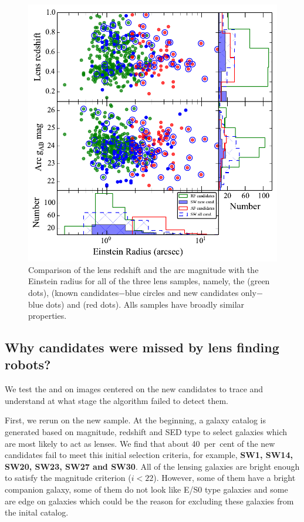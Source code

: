 \documentclass[useAMS,usenatbib,a4paper]{mn2e}
\begin{document}
\begin{figure}
\begin{center}
\includegraphics[scale=0.65]{zl_mg_re.pdf}
\caption{ \label{fig:zlmgre}
Comparison of the lens redshift and the arc magnitude with the
Einstein radius for all of the three lens samples, namely, the \rf (green dots),
\sw (known candidates$-$blue circles and new candidates only$-$blue dots)
and \af (red dots). Alls samples have broadly similar properties.}
\end{center}
\end{figure}

\subsection{Why \sw candidates were missed by lens finding robots?}
We test the \rf and \af on images centered on the new \sw candidates to
trace and understand at what stage the algorithm failed to detect them.

First, we rerun \rf on the new \sw sample. At the beginning, a galaxy
catalog is generated based on magnitude, redshift and SED type
\citep[see]{Gavazzi2014} to select galaxies which are most likely to act
as lenses. We find that about 40~per~cent of the new \sw candidates fail to
meet this initial selection criteria, for example, {\bf SW1, SW14, SW20,
SW23, SW27 and SW30}. All of the lensing galaxies are bright enough to
satisfy the magnitude criterion ($i<22$). However, some of them have a
bright companion galaxy, some of them do not look like E/S0 type
galaxies and some are edge on galaxies which could be the reason for
excluding these galaxies from the inital catalog.
\end{document}
